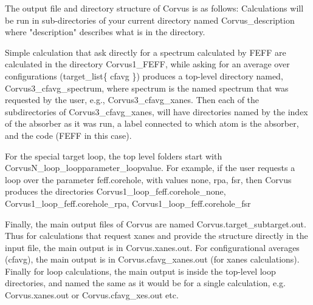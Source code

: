 The output file and directory structure of Corvus is as follows:
Calculations will be run in sub-directories of your current directory named Corvus\_description
where "description" describes what is in the directory. 

Simple calculation that ask directly for a spectrum calculated by FEFF are calculated in the directory
Corvus1\_FEFF, while asking for an average over configurations (target\_list\{ cfavg \}) produces a top-level
directory named,
Corvus3\_cfavg\_spectrum, where spectrum is the named spectrum that was requested by the user, e.g., 
Corvus3\_cfavg\_xanes. Then each of the subdirectories of Corvus3\_cfavg\_xanes, will have directories named by the
index of the absorber as it was run, a label connected to which atom is the absorber, and the code (FEFF in this case). 

For the special target loop, the top level folders start with CorvusN\_loop\_loopparameter\_loopvalue. For example, if the user requests a loop over the parameter feff.corehole, with 
values none, rpa, fsr, then Corvus produces the directories Corvus1\_loop\_feff.corehole\_none, Corvus1\_loop\_feff.corehole\_rpa, Corvus1\_loop\_feff.corehole\_fsr

Finally, the main output files of Corvus are named Corvus.target\_subtarget.out. Thus for calculations that request xanes and provide the structure directly in the input file, the main output
is in Corvus.xanes.out. For configurational averages (cfavg), the main output is in
Corvus.cfavg\_xanes.out (for xanes calculations). Finally for loop calculations, the main output is inside the top-level loop directories, and named the same as it would be for a single calculation, e.g. Corvus.xanes.out or Corvus.cfavg\_xes.out etc. 
